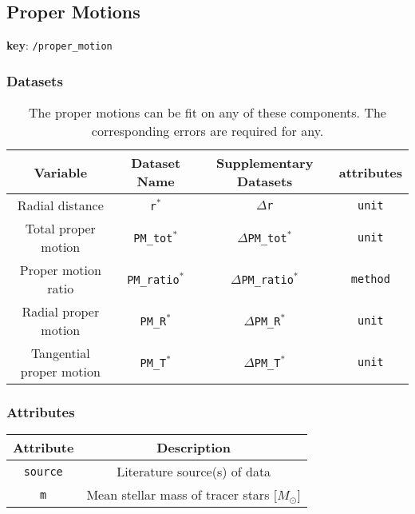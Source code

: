 \subsection{Proper Motions}

\textbf{key}: \texttt{/proper\_motion}

\subsubsection{Datasets}

\begin{center}
\begin{table}[H]
\begin{tabular}{ | c | c | c | c | }
    \hline
    Variable & Dataset Name & Supplementary Datasets &  attributes \\
    \hline\hline
    Radial distance & \texttt{r\(^*\)} & \texttt{\(\Delta\)r} & \texttt{unit} \\
    \hline
    Total proper motion & \texttt{PM\_tot\(^*\)} &
    \texttt{\(\Delta\)PM\_tot\(^*\)} & \texttt{unit}\\
    \hline
    Proper motion ratio & \texttt{PM\_ratio\(^*\)} &
    \texttt{\(\Delta\)PM\_ratio\(^*\)} & \texttt{method} \\
    \hline
    Radial proper motion & \texttt{PM\_R\(^*\)} &
    \texttt{\(\Delta\)PM\_R\(^*\)} & \texttt{unit}\\
    \hline
    Tangential proper motion & \texttt{PM\_T\(^*\)} &
    \texttt{\(\Delta\)PM\_T\(^*\)} & \texttt{unit}\\
    \hline
\end{tabular}
\caption*{
    The proper motions can be fit on any of these components.
    The corresponding errors are required for any.
}
\end{table}
\end{center}

\subsubsection{Attributes}


\begin{center}
\begin{table}[H]
\begin{tabular}{ | c | c | }
    \hline
    Attribute & Description \\
    \hline\hline
    \texttt{source} & Literature source(s) of data \\
    \hline
    \texttt{m} & Mean stellar mass of tracer stars [\(M_\odot\)] \\
    \hline
\end{tabular}
\end{table}
\end{center}

